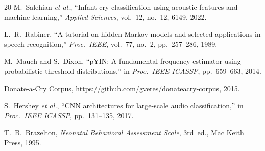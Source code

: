 \documentclass[11pt,a4paper]{article}
\begin{document}
\begin{thebibliography}{20}
M.~Salehian \textit{et al.},
``Infant cry classification using acoustic features and machine
learning,''
\textit{Applied Sciences}, vol.~12, no.~12, 6149, 2022.

L.~R.~Rabiner,
``A tutorial on hidden Markov models and selected applications in
speech recognition,''
\textit{Proc.\ IEEE}, vol.~77, no.~2, pp.~257--286, 1989.

M.~Mauch and S.~Dixon,
``pYIN: A fundamental frequency estimator using probabilistic
threshold distributions,''
in \textit{Proc.\ IEEE ICASSP}, pp.~659--663, 2014.

Donate-a-Cry Corpus,
\url{https://github.com/gveres/donateacry-corpus}, 2015.

S.~Hershey \textit{et al.},
``CNN architectures for large-scale audio classification,''
in \textit{Proc.\ IEEE ICASSP}, pp.~131--135, 2017.

T.~B.~Brazelton,
\textit{Neonatal Behavioral Assessment Scale},
3rd~ed., Mac Keith Press, 1995.

\end{thebibliography}
\end{document}
